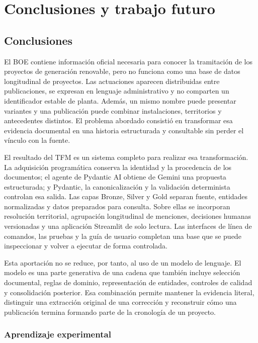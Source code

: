 \chapter{Conclusiones y trabajo futuro}
\label{ch:conclusiones}

\section{Conclusiones}

El BOE contiene información oficial necesaria para conocer la tramitación de
los proyectos de generación renovable, pero no funciona como una base de datos
longitudinal de proyectos. Las actuaciones aparecen distribuidas entre
publicaciones, se expresan en lenguaje administrativo y no comparten un
identificador estable de planta. Además, un mismo nombre puede presentar
variantes y una publicación puede combinar instalaciones, territorios y
antecedentes distintos. El problema abordado consistió en transformar esa
evidencia documental en una historia estructurada y consultable sin perder el
vínculo con la fuente.

El resultado del TFM es un sistema completo para realizar esa transformación.
La adquisición programática conserva la identidad y la procedencia de los
documentos; el agente de Pydantic AI obtiene de Gemini una propuesta
estructurada; y Pydantic, la canonicalización y la validación determinista
controlan esa salida. Las capas Bronze, Silver y Gold separan fuente, entidades normalizadas
y datos preparados para consulta. Sobre ellas se incorporan resolución
territorial, agrupación longitudinal de menciones, decisiones humanas
versionadas y una aplicación Streamlit de solo lectura. Las interfaces de
línea de comandos, las pruebas y la guía de usuario completan una base que se
puede inspeccionar y volver a ejecutar de forma controlada.

Esta aportación no se reduce, por tanto, al uso de un modelo de lenguaje. El
modelo es una parte generativa de una cadena que también incluye selección
documental, reglas de dominio, representación de entidades, controles de
calidad y consolidación posterior. Esa combinación permite mantener la
evidencia literal, distinguir una extracción original de una corrección y
reconstruir cómo una publicación termina formando parte de la cronología de
un proyecto.

\subsection{Aprendizaje experimental}


